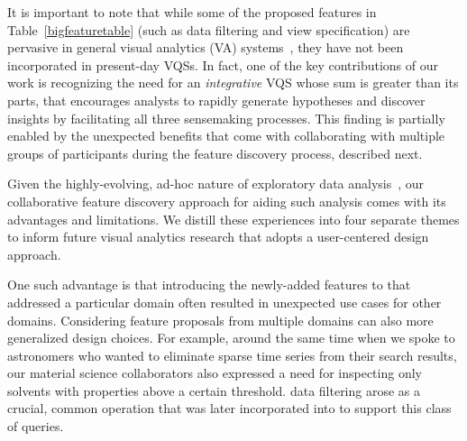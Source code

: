  \par It is important to note that while some of the proposed features in Table~\ref{bigfeaturetable} (such as data filtering and view specification) are pervasive in general visual analytics (VA) systems~\cite{Heer2012,Amar2005}, they have not been incorporated in present-day VQSs. In fact, one of the key contributions of our work is recognizing the need for an \emph{integrative} VQS whose sum is greater than its parts, that encourages analysts to rapidly generate hypotheses and discover insights by facilitating all three sensemaking processes. This finding is partially enabled by the unexpected benefits that come with collaborating with multiple groups of participants during the feature discovery process, described next.
 \par Given the highly-evolving, ad-hoc nature of exploratory data analysis~\cite{Keim2006,Tukey1970}, our collaborative feature discovery approach for aiding such analysis comes with its advantages and limitations. We distill these experiences into four separate themes to inform future visual analytics research that adopts a user-centered design approach.
 \npar {}
 \par One such advantage is that introducing the newly-added features to \zvpp that addressed a particular domain often resulted in unexpected use cases for other domains. Considering feature proposals from multiple domains can also  more generalized design choices. For example, around the same time when we spoke to astronomers who wanted to eliminate sparse time series from their search results, our material science collaborators also expressed a need for inspecting only solvents with properties above a certain threshold.  data filtering arose as a crucial, common operation that was later incorporated into \zvpp to support this class of queries. %
